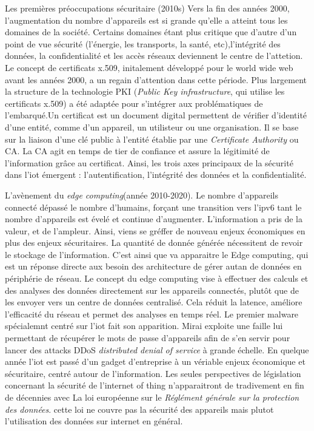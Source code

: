 Les premières préoccupations sécuritaire (2010s)
Vers la fin des années 2000, l'augmentation du nombre d'appareils est si grande qu'elle a atteint tous les domaines de la société. Certains domaines étant plus critique que d'autre d'un point de vue sécurité (l'énergie, les transports, la santé, etc),l'intégrité des données, la confidentialité et les accès réseaux deviennent le centre de l'attetion. 
Le concept de certificats x.509, initalement développé pour le world wide web avant les années 2000, a un regain d'attention dans cette période. Plus largement la structure de la technologie PKI (\textit{Public Key infrastructure}, qui utilise les certificats x.509) a été adaptée pour s'intégrer aux problématiques de l'embarqué.Un certificat est un document digital permettent de vérifier d'identité d'une entité, comme d'un appareil, un utilisteur ou une organisation. Il se base sur la liaison d'une clé public à l'entité établie par une \textit{Certificate Authority} ou CA. La CA agit en temps de tier de confiance et assure la légitimité de l'information grâce au certificat. Ainsi, les trois axes principaux de la sécurité dans l'iot émergent : l'autentification, l'intégrité des données et la confidentialité.


L'avènement du \textit{edge computing}(année 2010-2020).
Le nombre d'appareils connecté  dépassé le nombre d'humains, forçant une transition vers l'ipv6 tant le nombre d'appareils est évelé et continue d'augmenter. L'information a pris de la valeur, et de l'ampleur. Ainsi, viens se gréffer de nouveau enjeux économiques en plus des enjeux sécuritaires. La quantité de donnée générée nécessitent de revoir le stockage de l'information. C'est ainsi que va apparaitre le Edge computing, qui est un réponse directe aux besoin des architecture de gérer autan de données en périphérie de réseau. Le concept du edge computing vise à effectuer des calculs et des analyses des données directement sur les appareils connectés, plutôt que de les envoyer vers un centre de données centralisé. Cela réduit la latence, améliore l'efficacité du réseau et permet des analyses en temps réel. Le premier malware spécialemnt centré sur l'iot fait son apparition. Mirai exploite une faille lui permettant de récupérer le mots de passe d'appareils afin de s'en servir pour lancer des attacks DDoS \textit{distributed denial of service} à grande échelle. En quelque année l'iot est passé d'un gadget d'entreprise à un vériable enjeux économique et sécuritaire, centré autour de l'information. Les seules perspectives de législation concernant la sécurité de l'internet of thing n'apparaitront de tradivement en fin de décennies avec La loi européenne sur le \textit{Réglément générale sur la protection des données}. cette loi ne couvre pas la sécurité des appareils mais plutot l'utilisation des données sur internet en général.


